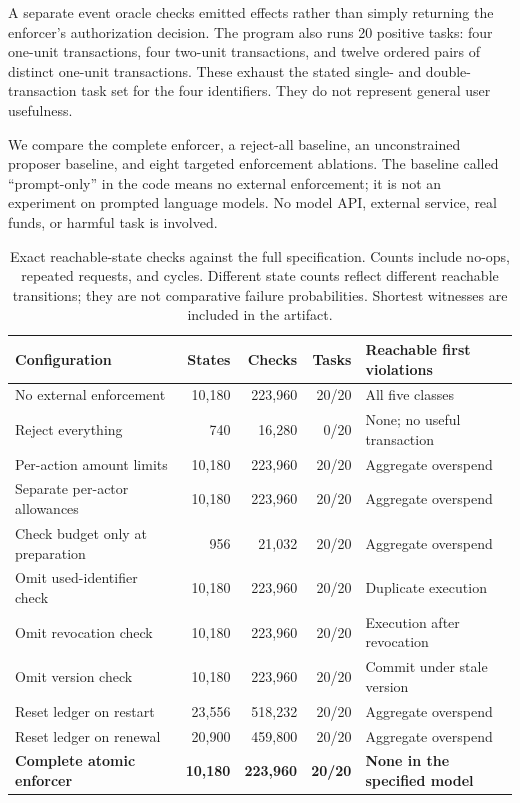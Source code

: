 \documentclass[10pt,twocolumn,letterpaper]{article}
\begin{document}
A separate event oracle checks emitted effects rather than simply returning the enforcer's authorization decision. The program also runs 20 positive tasks: four one-unit transactions, four two-unit transactions, and twelve ordered pairs of distinct one-unit transactions. These exhaust the stated single- and double-transaction task set for the four identifiers. They do not represent general user usefulness.

We compare the complete enforcer, a reject-all baseline, an unconstrained proposer baseline, and eight targeted enforcement ablations. The baseline called ``prompt-only'' in the code means no external enforcement; it is not an experiment on prompted language models. No model API, external service, real funds, or harmful task is involved.

\begin{table}[t]
\centering\small
\begin{tabularx}{\textwidth}{@{}P{.29\textwidth}rrrL@{}}
\toprule
\textbf{Configuration} & \textbf{States} & \textbf{Checks} & \textbf{Tasks} & \textbf{Reachable first violations}\\
\midrule
No external enforcement & 10,180 & 223,960 & 20/20 & All five classes\\
Reject everything & 740 & 16,280 & 0/20 & None; no useful transaction\\
Per-action amount limits & 10,180 & 223,960 & 20/20 & Aggregate overspend\\
Separate per-actor allowances & 10,180 & 223,960 & 20/20 & Aggregate overspend\\
Check budget only at preparation & 956 & 21,032 & 20/20 & Aggregate overspend\\
Omit used-identifier check & 10,180 & 223,960 & 20/20 & Duplicate execution\\
Omit revocation check & 10,180 & 223,960 & 20/20 & Execution after revocation\\
Omit version check & 10,180 & 223,960 & 20/20 & Commit under stale version\\
Reset ledger on restart & 23,556 & 518,232 & 20/20 & Aggregate overspend\\
Reset ledger on renewal & 20,900 & 459,800 & 20/20 & Aggregate overspend\\
\textbf{Complete atomic enforcer} & \textbf{10,180} & \textbf{223,960} & \textbf{20/20} & \textbf{None in the specified model}\\
\bottomrule
\end{tabularx}
\caption{Exact reachable-state checks against the full specification. Counts include no-ops, repeated requests, and cycles. Different state counts reflect different reachable transitions; they are not comparative failure probabilities. Shortest witnesses are included in the artifact.}
\label{tab:results}
\end{table}
\end{document}
